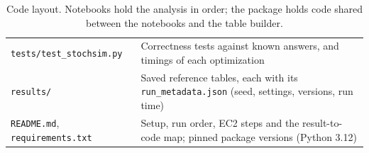 \begin{table}[htbp]
\begin{tabular}{p{4.3cm}p{10.2cm}}
\texttt{tests/test\_stochsim.py} & Correctness tests against known answers, and timings of each optimization \\
\texttt{results/} & Saved reference tables, each with its \texttt{run\_metadata.json} (seed, settings, versions, run time) \\
\texttt{README.md}, \texttt{requirements.txt} & Setup, run order, EC2 steps and the result-to-code map; pinned package versions (Python 3.12) \\
\bottomrule
\end{tabular}
\caption{Code layout. Notebooks hold the analysis in order; the package holds code shared between the notebooks and the table builder.}
\label{tab:code}
\end{table}
